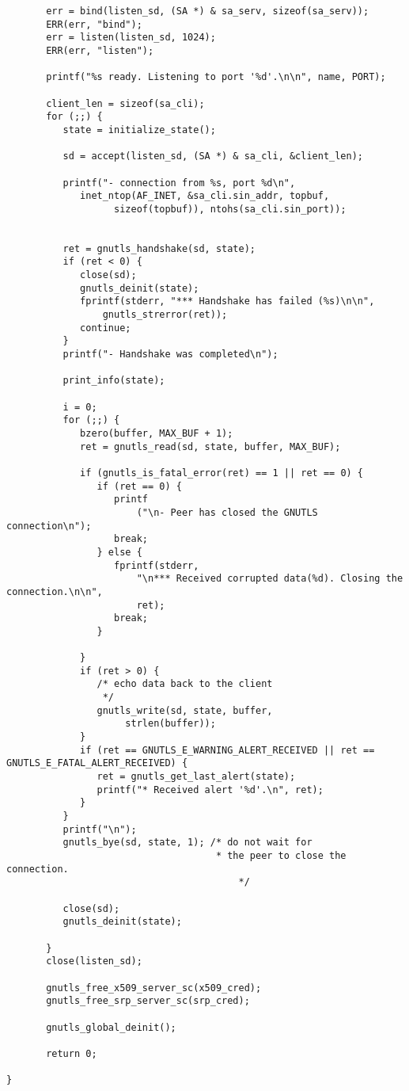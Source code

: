 \begin{verbatim}
       err = bind(listen_sd, (SA *) & sa_serv, sizeof(sa_serv));
       ERR(err, "bind");
       err = listen(listen_sd, 1024);
       ERR(err, "listen");

       printf("%s ready. Listening to port '%d'.\n\n", name, PORT);

       client_len = sizeof(sa_cli);
       for (;;) {
	      state = initialize_state();

	      sd = accept(listen_sd, (SA *) & sa_cli, &client_len);

	      printf("- connection from %s, port %d\n",
		     inet_ntop(AF_INET, &sa_cli.sin_addr, topbuf,
			       sizeof(topbuf)), ntohs(sa_cli.sin_port));


	      ret = gnutls_handshake(sd, state);
	      if (ret < 0) {
		     close(sd);
		     gnutls_deinit(state);
		     fprintf(stderr, "*** Handshake has failed (%s)\n\n",
			     gnutls_strerror(ret));
		     continue;
	      }
	      printf("- Handshake was completed\n");

	      print_info(state);

	      i = 0;
	      for (;;) {
		     bzero(buffer, MAX_BUF + 1);
		     ret = gnutls_read(sd, state, buffer, MAX_BUF);

		     if (gnutls_is_fatal_error(ret) == 1 || ret == 0) {
			    if (ret == 0) {
				   printf
				       ("\n- Peer has closed the GNUTLS connection\n");
				   break;
			    } else {
				   fprintf(stderr,
					   "\n*** Received corrupted data(%d). Closing the connection.\n\n",
					   ret);
				   break;
			    }

		     }
		     if (ret > 0) {
			    /* echo data back to the client
			     */
			    gnutls_write(sd, state, buffer,
					 strlen(buffer));
		     }
		     if (ret == GNUTLS_E_WARNING_ALERT_RECEIVED || ret == GNUTLS_E_FATAL_ALERT_RECEIVED) {
			    ret = gnutls_get_last_alert(state);
			    printf("* Received alert '%d'.\n", ret);
		     }
	      }
	      printf("\n");
	      gnutls_bye(sd, state, 1); /* do not wait for
	                                 * the peer to close the connection.
                                         */
                                         
	      close(sd);
	      gnutls_deinit(state);

       }
       close(listen_sd);

       gnutls_free_x509_server_sc(x509_cred);
       gnutls_free_srp_server_sc(srp_cred);

       gnutls_global_deinit();

       return 0;

}

\end{verbatim}
